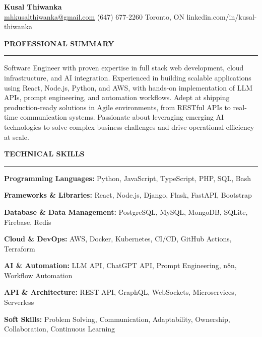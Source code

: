\documentclass[10pt,letterpaper]{article}
\begin{document}
\begin{center}
{\LARGE\textbf{Kusal Thiwanka}}\\[3pt]
\href{mailto:mhkusalthiwanka@gmail.com}{mhkusalthiwanka@gmail.com}\hspace{2em}%
(647) 677{-}2260\hspace{2em}%
Toronto, ON\hspace{2em}
linkedin.com/in/kusal-thiwanka
\end{center}

\vspace{6pt}

\textbf{PROFESSIONAL SUMMARY}\\[-8pt]
\noindent\rule{\textwidth}{1pt}

\vspace{-2pt}

Software Engineer with proven expertise in full stack web development, cloud infrastructure, and AI integration. Experienced in building scalable applications using React, Node.js, Python, and AWS, with hands-on implementation of LLM APIs, prompt engineering, and automation workflows. Adept at shipping production-ready solutions in Agile environments, from RESTful APIs to real-time communication systems. Passionate about leveraging emerging AI technologies to solve complex business challenges and drive operational efficiency at scale.

\vspace{8pt}

\textbf{TECHNICAL SKILLS}\\[-8pt]
\noindent\rule{\textwidth}{1pt}

\vspace{-2pt}

\textbf{Programming Languages:} Python, JavaScript, TypeScript, PHP, SQL, Bash

\textbf{Frameworks \& Libraries:} React, Node.js, Django, Flask, FastAPI, Bootstrap

\textbf{Database \& Data Management:} PostgreSQL, MySQL, MongoDB, SQLite, Firebase, Redis

\textbf{Cloud \& DevOps:} AWS, Docker, Kubernetes, CI/CD, GitHub Actions, Terraform

\textbf{AI \& Automation:} LLM API, ChatGPT API, Prompt Engineering, n8n, Workflow Automation

\textbf{API \& Architecture:} REST API, GraphQL, WebSockets, Microservices, Serverless

\textbf{Soft Skills:} Problem Solving, Communication, Adaptability, Ownership, Collaboration, Continuous Learning
\end{document}
